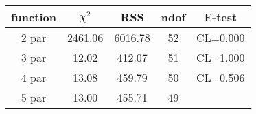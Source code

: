 \begin{tabular}{c|c|c|c|c}
function & $\chi^2$ & RSS & ndof & F-test \\
\hline
2 par & 2461.06 & 6016.78 & 52 & CL=0.000 \\
3 par & 12.02 & 412.07 & 51 & CL=1.000 \\
4 par & 13.08 & 459.79 & 50 & CL=0.506 \\
5 par & 13.00 & 455.71 & 49 & \\
\hline
\end{tabular}